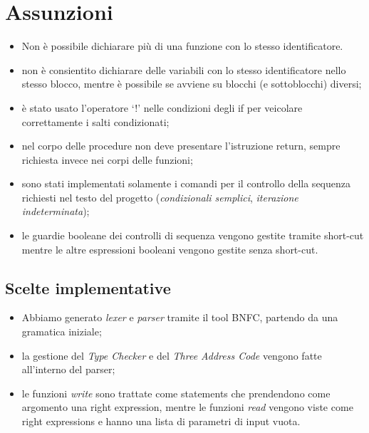 \documentclass[12pt]{article}
\begin{document}
\begin{center}
\end{center}

\begin{center}
\end{center}

\section*{Assunzioni}
\begin{itemize}
\item Non è possibile dichiarare più di una funzione con lo stesso identificatore.
\item non è consientito dichiarare delle variabili con lo stesso identificatore nello stesso blocco, mentre è possibile se avviene su blocchi (e sottoblocchi) diversi;
\item è stato usato l'operatore `!' nelle condizioni degli if per veicolare correttamente i salti condizionati;
\item nel corpo delle procedure non deve presentare l'istruzione return, sempre richiesta invece nei corpi delle funzioni;
\item sono stati implementati solamente i comandi per il controllo della sequenza richiesti nel testo del progetto (\textit{condizionali semplici}, \textit{iterazione indeterminata});
\item le guardie booleane dei controlli di sequenza vengono gestite tramite short-cut mentre le altre espressioni booleani vengono gestite senza short-cut.
\end{itemize}

\subsection*{Scelte implementative}
\begin{itemize}
\item Abbiamo generato \textit{lexer} e \textit{parser} tramite il tool BNFC, partendo da una gramatica iniziale;
\item la gestione del \textit{Type Checker} e del \textit{Three Address Code} vengono fatte all'interno del parser;
\item le funzioni \textit{write} sono trattate come statements che prendendono come argomento una right expression, mentre le funzioni \textit{read} vengono viste come right expressions e hanno una lista di parametri di input vuota.
\end{itemize}
\end{document}
